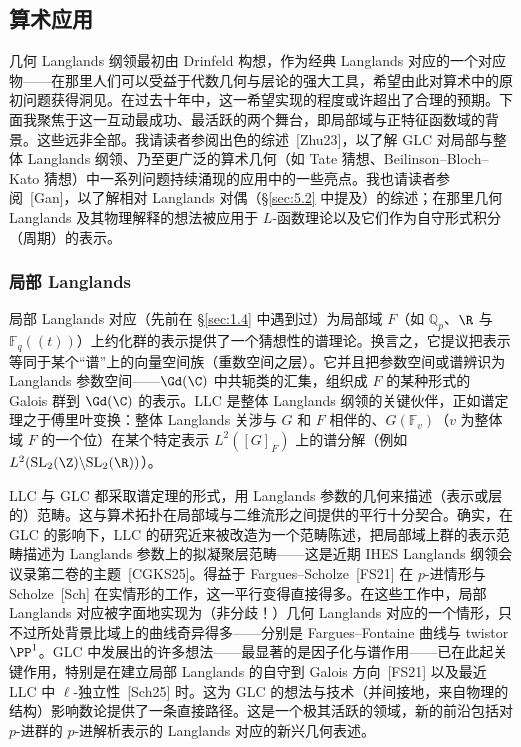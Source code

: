 \subsection{算术应用}\label{sec:6.1}

几何 Langlands 纲领最初由 Drinfeld 构想，作为经典 Langlands 对应的一个对应物——在那里人们可以受益于代数几何与层论的强大工具，希望由此对算术中的原初问题获得洞见。在过去十年中，这一希望实现的程度或许超出了合理的预期。下面我聚焦于这一互动最成功、最活跃的两个舞台，即局部域与正特征函数域的背景。这些远非全部。我请读者参阅出色的综述~[Zhu23]，以了解 GLC 对局部与整体 Langlands 纲领、乃至更广泛的算术几何（如 Tate 猜想、Beilinson–Bloch–Kato 猜想）中一系列问题持续涌现的应用中的一些亮点。我也请读者参阅~[Gan]，以了解相对 Langlands 对偶（\S\ref{sec:5.2} 中提及）的综述；在那里几何 Langlands 及其物理解释的想法被应用于 $L$-函数理论以及它们作为自守形式积分（周期）的表示。

\subsubsection{局部 Langlands}\label{sec:6.1.1}

局部 Langlands 对应（先前在 \S\ref{sec:1.4} 中遇到过）为局部域 $F$（如 $\mathbb{Q}_{p}$、$\R$ 与 $\mathbb{F}_{q}((t))$）上约化群的表示提供了一个猜想性的谱理论。换言之，它提议把表示等同于某个“谱”上的向量空间族（重数空间之层）。它并且把参数空间或谱辨识为 Langlands 参数空间——$\Gd(\C)$ 中共轭类的汇集，组织成 $F$ 的某种形式的 Galois 群到 $\Gd(\C)$ 的表示。LLC 是整体 Langlands 纲领的关键伙伴，正如谱定理之于傅里叶变换：整体 Langlands 关涉与 $G$ 和 $F$ 相伴的、$G(\mathbb{F}_{v})$（$v$ 为整体域 $F$ 的一个位）在某个特定表示 $L^{2}([G]_{F})$ 上的谱分解（例如 $L^{2}(\mathrm{SL}_{2}(\Z)\backslash\mathrm{SL}_{2}(\R))$）。

LLC 与 GLC 都采取谱定理的形式，用 Langlands 参数的几何来描述（表示或层的）范畴。这与算术拓扑在局部域与二维流形之间提供的平行十分契合。确实，在 GLC 的影响下，LLC 的研究近来被改造为一个范畴陈述，把局部域上群的表示范畴描述为 Langlands 参数上的拟凝聚层范畴——这是近期 IHES Langlands 纲领会议录第二卷的主题~[CGKS25]。得益于 Fargues–Scholze~[FS21] 在 $p$-进情形与 Scholze~[Sch] 在实情形的工作，这一平行变得直接得多。在这些工作中，局部 Langlands 对应被字面地实现为（非分歧！）几何 Langlands 对应的一个情形，只不过所处背景比域上的曲线奇异得多——分别是 Fargues–Fontaine 曲线与 twistor $\PP^{1}$。GLC 中发展出的许多想法——最显著的是因子化与谱作用——已在此起关键作用，特别是在建立局部 Langlands 的自守到 Galois 方向~[FS21] 以及最近 LLC 中 $\ell$-独立性~[Sch25] 时。这为 GLC 的想法与技术（并间接地，来自物理的结构）影响数论提供了一条直接路径。这是一个极其活跃的领域，新的前沿包括对 $p$-进群的 $p$-进解析表示的 Langlands 对应的新兴几何表述。

